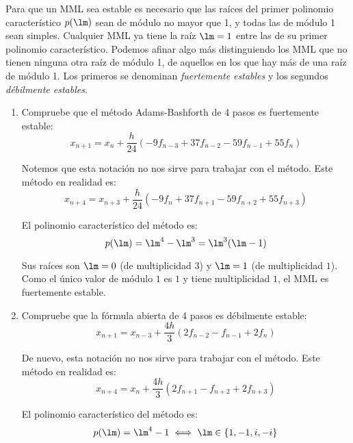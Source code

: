 \begin{ejercicio}\label{ej:3.1.17}
    Para que un MML sea estable es necesario que las raíces del primer polinomio característico $p(\lm)$ sean de módulo no mayor que 1, y todas las de módulo 1 sean simples. Cualquier MML ya tiene la raíz $\lm = 1$ entre las de su primer polinomio característico. Podemos afinar algo más distinguiendo los MML que no tienen ninguna otra raíz de módulo 1, de aquellos en los que hay más de una raíz de módulo 1. Los primeros se denominan \emph{fuertemente estables} y los segundos \emph{débilmente estables}.
    \begin{enumerate}
        \item Compruebe que el método Adams-Bashforth de 4 pasos es fuertemente estable:
        \begin{equation*}
            x_{n+1} = x_n + \frac{h}{24} (-9 f_{n-3} + 37 f_{n-2} - 59 f_{n-1} + 55 f_n)
        \end{equation*}

        Notemos que esta notación no nos sirve para trabajar con el método. Este método en realidad es:
        \begin{equation*}
            x_{n+4} = x_{n+3} + \frac{h}{24} (-9 f_{n} + 37 f_{n+1} - 59 f_{n+2} + 55 f_{n+3})
        \end{equation*}

        El polinomio característico del método es:
        \begin{equation*}
            p(\lm) = \lm^4-\lm^3 = \lm^3(\lm-1)
        \end{equation*}

        Sus raíces son $\lm = 0$ (de multiplicidad $3$) y $\lm = 1$ (de multiplicidad $1$). Como el único valor de módulo $1$ es $1$ y tiene multiplicidad $1$, el MML es fuertemente estable.
        \item Compruebe que la fórmula abierta de 4 pasos es débilmente estable:
        \begin{equation*}
            x_{n+1} = x_{n-3} + \frac{4h}{3} (2 f_{n-2} - f_{n-1} + 2 f_n)
        \end{equation*}

        De nuevo, esta notación no nos sirve para trabajar con el método. Este método en realidad es:
        \begin{equation*}
            x_{n+4} = x_{n} + \frac{4h}{3} (2 f_{n+1} - f_{n+2} + 2 f_{n+3})
        \end{equation*}

        El polinomio característico del método es:
        \begin{equation*}
            p(\lm) = \lm^4 - 1 \iff \lm\in \{1,-1,i,-i\}
        \end{equation*}


\end{enumerate}
\end{ejercicio}
